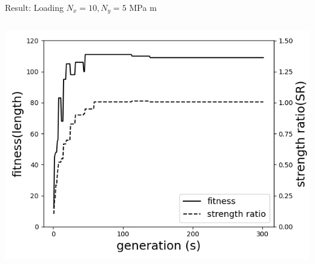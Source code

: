 \documentclass{beamer}
\begin{document}
\begin{frame}{Result: Loading $N_x = 10, N_y=5 $ MPa m}
    \begin{columns}
    \begin{column}{0.5\textwidth}

        \begin{center}
            \includegraphics[width=1.0\linewidth]{2020-11-10-pre-image/two_distinct_angle_fitness_and_sr.png}
        \end{center}


\end{column}
\end{columns}
\end{frame}
\end{document}
